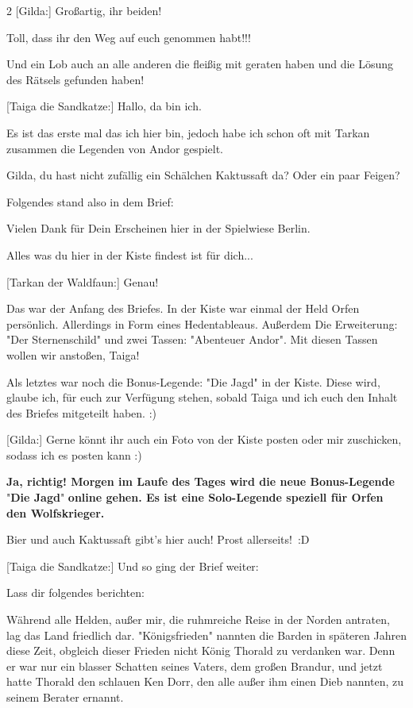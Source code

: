 \documentclass[10pt, a4paper, oneside]{book}
\begin{document}
\begin{multicols}{2}
[Gilda:] Großartig, ihr beiden!

Toll, dass ihr den Weg auf euch genommen habt!!!

Und ein Lob auch an alle anderen die fleißig mit geraten haben und die Lösung des Rätsels gefunden haben!

[Taiga die Sandkatze:] Hallo, da bin ich.

Es ist das erste mal das ich hier bin, jedoch habe ich schon oft mit Tarkan zusammen die Legenden von Andor gespielt.

Gilda, du hast nicht zufällig ein Schälchen Kaktussaft da? Oder ein paar Feigen?

Folgendes stand also in dem Brief:

Vielen Dank für Dein Erscheinen hier in der Spielwiese Berlin.

Alles was du hier in der Kiste findest ist für dich... 

[Tarkan der Waldfaun:] Genau!

Das war der Anfang des Briefes. In der Kiste war einmal der Held Orfen persönlich. Allerdings in Form eines Hedentableaus. Außerdem Die Erweiterung: "Der Sternenschild" und zwei Tassen: "Abenteuer Andor". Mit diesen Tassen wollen wir anstoßen, Taiga!

Als letztes war noch die Bonus-Legende: "Die Jagd" in der Kiste. Diese wird, glaube ich, für euch zur Verfügung stehen, sobald Taiga und ich euch den Inhalt des Briefes mitgeteilt haben. :)

[Gilda:] Gerne könnt ihr auch ein Foto von der Kiste posten oder mir zuschicken, sodass ich es posten kann :)

\textbf{Ja, richtig! Morgen im Laufe des Tages wird die neue Bonus-Legende} "\textbf{Die Jagd}" \textbf{online gehen. Es ist eine Solo-Legende speziell für Orfen den Wolfskrieger.}


Bier und auch Kaktussaft gibt's hier auch! Prost allerseits! :D

[Taiga die Sandkatze:] Und so ging der Brief weiter:

Lass dir folgendes berichten:

Während alle Helden, außer mir, die ruhmreiche Reise in der Norden antraten, lag das Land friedlich dar. "Königsfrieden" nannten die Barden in späteren Jahren diese Zeit, obgleich dieser Frieden nicht König Thorald zu verdanken war. Denn er war nur ein blasser Schatten seines Vaters, dem großen Brandur, und jetzt hatte Thorald den schlauen Ken Dorr, den alle außer ihm einen Dieb nannten, zu seinem Berater ernannt.


\end{multicols}
\end{document}
